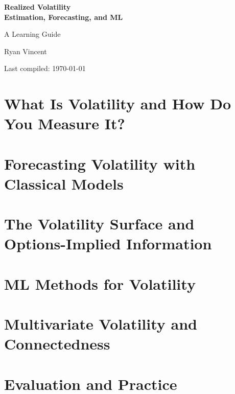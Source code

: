 \documentclass[11pt,a4paper]{report}
\begin{document}
\begin{titlepage}
\centering
\vspace*{3cm}
{\Huge\bfseries Realized Volatility\\[0.4cm]
Estimation, Forecasting, and ML\par}
\vspace{1.5cm}
{\Large A Learning Guide\par}
\vspace{1cm}
{\Large Ryan Vincent\par}
\vfill
{\small Last compiled: \today\par}
\end{titlepage}

\tableofcontents
\newpage

\part{What Is Volatility and How Do You Measure It?}





\part{Forecasting Volatility with Classical Models}




\part{The Volatility Surface and Options-Implied Information}



\part{ML Methods for Volatility}






\part{Multivariate Volatility and Connectedness}




\part{Evaluation and Practice}







\end{document}
